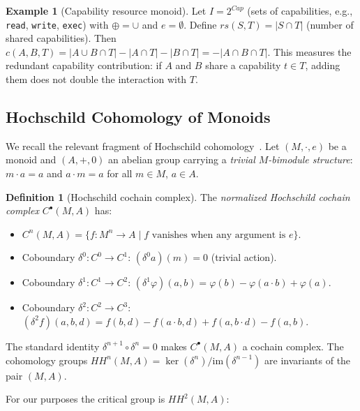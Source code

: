 \documentclass[acmsmall,sigplan,anonymous,review,screen]{acmart}
\theoremstyle{plain}
\theoremstyle{definition}
\newtheorem{definition}[theorem]{Definition}
\newtheorem{example}[theorem]{Example}
\newcommand{\rs}{\mathit{rs}}
\newcommand{\HH}[2]{H\!H^{#1}(#2)}
\begin{document}
\begin{example}[Capability resource monoid]
\label{ex:cap}
  Let $I = 2^{\mathit{Cap}}$ (sets of capabilities, e.g., \texttt{read},
  \texttt{write}, \texttt{exec}) with $\oplus = \cup$ and $e = \emptyset$.
  Define $\rs(S, T) = |S \cap T|$ (number of shared capabilities).
  Then $c(A, B, T) = |A \cup B \cap T| - |A \cap T| - |B \cap T|
  = -|A \cap B \cap T|$.  This measures the redundant capability
  contribution: if $A$ and $B$ share a capability $t \in T$, adding
  them does not double the interaction with $T$.
\end{example}

\subsection{Hochschild Cohomology of Monoids}
\label{sec:background:hochschild}

We recall the relevant fragment of Hochschild cohomology~\cite{hochschild1945cohomology}.
Let $(M, \cdot, e)$ be a monoid and $(A, +, 0)$ an abelian group carrying
a \emph{trivial $M$-bimodule structure}: $m \cdot a = a$ and $a \cdot m = a$
for all $m \in M$, $a \in A$.

\begin{definition}[Hochschild cochain complex]
\label{def:hochschild}
  The \emph{normalized Hochschild cochain complex} $C^\bullet(M, A)$ has:
  \begin{itemize}[itemsep=2pt]
    \item $C^n(M, A) = \{ f : M^n \to A \mid f \text{ vanishes when any argument is } e \}$.
    \item Coboundary $\delta^0 : C^0 \to C^1$: $(\delta^0 a)(m) = 0$ (trivial action).
    \item Coboundary $\delta^1 : C^1 \to C^2$:
      $(\delta^1 \varphi)(a, b) = \varphi(b) - \varphi(a \cdot b) + \varphi(a)$.
    \item Coboundary $\delta^2 : C^2 \to C^3$:
      $(\delta^2 f)(a, b, d) = f(b, d) - f(a \cdot b, d) + f(a, b \cdot d) - f(a, b)$.
  \end{itemize}
\end{definition}

The standard identity $\delta^{n+1} \circ \delta^n = 0$ makes
$C^\bullet(M, A)$ a cochain complex.  The cohomology groups
$\HH{n}{M, A} = \ker(\delta^n) / \mathrm{im}(\delta^{n-1})$ are
invariants of the pair $(M, A)$.

For our purposes the critical group is $\HH{2}{M, A}$:
\end{document}
